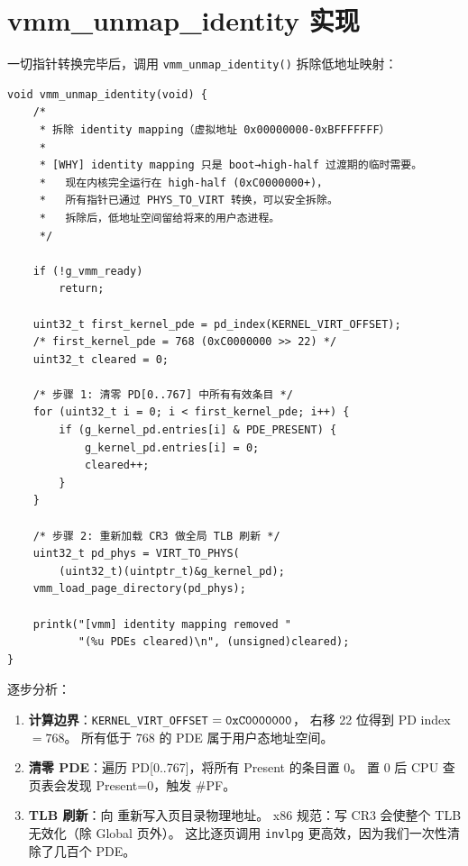 \section{vmm\_unmap\_identity 实现}
\label{sec:unmap-identity}

一切指针转换完毕后，调用 \texttt{vmm\_unmap\_identity()} 拆除低地址映射：

\begin{lstlisting}[style=cstyle, caption={vmm\_unmap\_identity() 完整实现}]
void vmm_unmap_identity(void) {
    /*
     * 拆除 identity mapping（虚拟地址 0x00000000-0xBFFFFFFF）
     *
     * [WHY] identity mapping 只是 boot→high-half 过渡期的临时需要。
     *   现在内核完全运行在 high-half (0xC0000000+)，
     *   所有指针已通过 PHYS_TO_VIRT 转换，可以安全拆除。
     *   拆除后，低地址空间留给将来的用户态进程。
     */

    if (!g_vmm_ready)
        return;

    uint32_t first_kernel_pde = pd_index(KERNEL_VIRT_OFFSET);
    /* first_kernel_pde = 768 (0xC0000000 >> 22) */
    uint32_t cleared = 0;

    /* 步骤 1: 清零 PD[0..767] 中所有有效条目 */
    for (uint32_t i = 0; i < first_kernel_pde; i++) {
        if (g_kernel_pd.entries[i] & PDE_PRESENT) {
            g_kernel_pd.entries[i] = 0;
            cleared++;
        }
    }

    /* 步骤 2: 重新加载 CR3 做全局 TLB 刷新 */
    uint32_t pd_phys = VIRT_TO_PHYS(
        (uint32_t)(uintptr_t)&g_kernel_pd);
    vmm_load_page_directory(pd_phys);

    printk("[vmm] identity mapping removed "
           "(%u PDEs cleared)\n", (unsigned)cleared);
}
\end{lstlisting}

逐步分析：

\begin{enumerate}
  \item \textbf{计算边界}：\texttt{KERNEL\_VIRT\_OFFSET} $= \texttt{0xC0000000}$，
        右移 22 位得到 PD index $= 768$。
        所有低于 768 的 PDE 属于用户态地址空间。

  \item \textbf{清零 PDE}：遍历 PD[0..767]，将所有 Present 的条目置 0。
        置 0 后 CPU 查页表会发现 Present=0，触发 \#PF。

  \item \textbf{TLB 刷新}：向  重新写入页目录物理地址。
        x86 规范：写 CR3 会使整个 TLB 无效化（除 Global 页外）。
        这比逐页调用 \texttt{invlpg} 更高效，因为我们一次性清除了几百个 PDE。
\end{enumerate}

